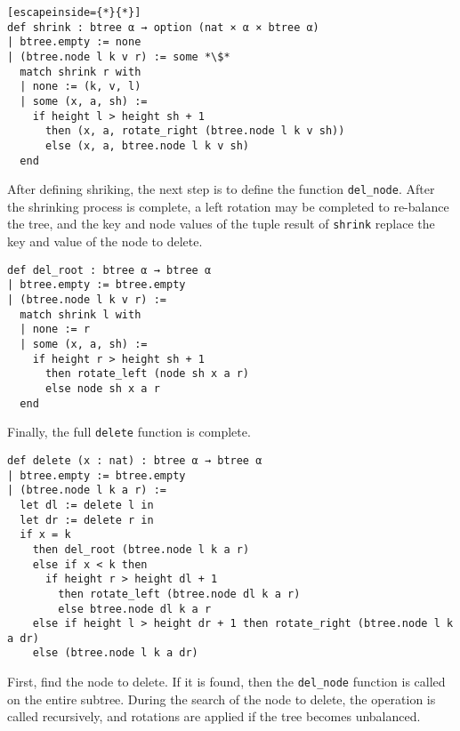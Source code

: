 \begin{lstlisting}[escapeinside={*}{*}]
def shrink : btree α → option (nat × α × btree α)
| btree.empty := none
| (btree.node l k v r) := some *\$*
  match shrink r with
  | none := (k, v, l)
  | some (x, a, sh) :=
    if height l > height sh + 1
      then (x, a, rotate_right (btree.node l k v sh))
      else (x, a, btree.node l k v sh)
  end
\end{lstlisting}

After defining shriking, the next step is to define the function \lstinline{del_node}. After the shrinking process is complete, a left rotation may be completed to re-balance the tree, and the key and node values of the tuple result of \lstinline{shrink} replace the key and value of the node to delete.

\begin{lstlisting}
def del_root : btree α → btree α
| btree.empty := btree.empty
| (btree.node l k v r) :=
  match shrink l with 
  | none := r
  | some (x, a, sh) :=
    if height r > height sh + 1 
      then rotate_left (node sh x a r)
      else node sh x a r
  end
\end{lstlisting}

Finally, the full \lstinline{delete} function is complete. 

\begin{lstlisting}
def delete (x : nat) : btree α → btree α
| btree.empty := btree.empty
| (btree.node l k a r) :=
  let dl := delete l in
  let dr := delete r in
  if x = k 
    then del_root (btree.node l k a r)
    else if x < k then
      if height r > height dl + 1 
        then rotate_left (btree.node dl k a r)
        else btree.node dl k a r
    else if height l > height dr + 1 then rotate_right (btree.node l k a dr)
    else (btree.node l k a dr)
\end{lstlisting}

First, find the node to delete. If it is found, then the \lstinline{del_node} function is called on the entire subtree. During the search of the node to delete, the operation is called recursively, and rotations are applied if the tree becomes unbalanced. 